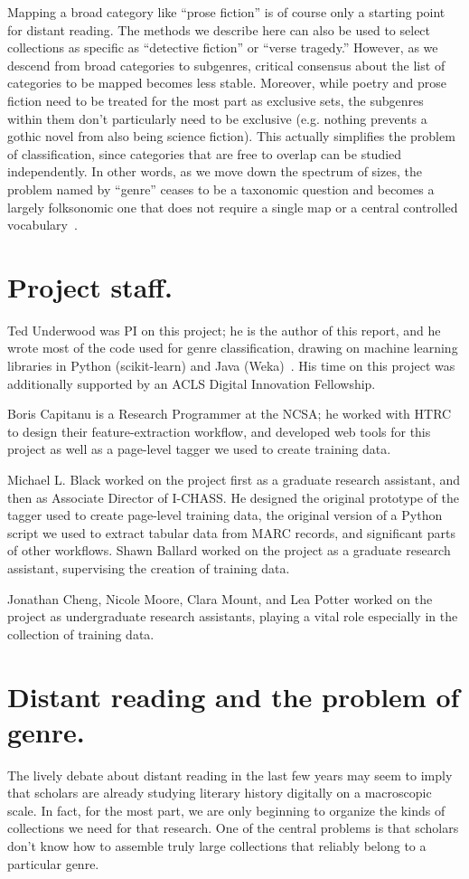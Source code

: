 \documentclass[paper=a4, fontsize=12pt]{scrartcl}
\numberwithin{equation}{section}		%
\numberwithin{figure}{section}			%
\numberwithin{table}{section}				%
\begin{document}
Mapping a broad category like ``prose fiction'' is of course only a starting point for distant reading. The methods we describe here can also be used to select collections as specific as ``detective fiction'' or ``verse tragedy.'' However, as we descend from broad categories to subgenres, critical consensus about the list of categories to be mapped becomes less stable. Moreover, while poetry and prose fiction need to be treated for the most part as exclusive sets, the subgenres within them don't particularly need to be exclusive (e.g. nothing prevents a gothic novel from also being science fiction). This actually simplifies the problem of classification, since categories that are free to overlap can be studied independently. In other words, as we move down the spectrum of sizes, the problem named by ``genre'' ceases to be a taxonomic question and becomes a largely folksonomic one that does not require a single map or a central controlled vocabulary~\cite{vanderwal:folksonomy}.

\section{Project staff.}
Ted Underwood was PI on this project; he is the author of this report, and he wrote most of the code used for genre classification, drawing on machine learning libraries in Python (scikit-learn) and Java (Weka)~\cite{scikit-learn, weka}. His time on this project was additionally supported by an ACLS Digital Innovation Fellowship.

Boris Capitanu is a Research Programmer at the NCSA; he worked with HTRC to design their feature-extraction workflow, and developed web tools for this project as well as a page-level tagger we used to create training data.

Michael L. Black worked on the project first as a graduate research assistant, and then as Associate Director of I-CHASS. He designed the original prototype of the tagger used to create page-level training data, the original version of a Python script we used to extract tabular data from MARC records, and significant parts of other workflows. Shawn Ballard worked on the project as a graduate research assistant, supervising the creation of training data.

Jonathan Cheng, Nicole Moore, Clara Mount, and Lea Potter worked on the project as undergraduate research assistants, playing a vital role especially in the collection of training data.

\newpage
\section{Distant reading and the problem of genre.}
The lively debate about distant reading in the last few years may seem to imply that scholars are already studying literary history digitally on a macroscopic scale. In fact, for the most part, we are only beginning to organize the kinds of collections we need for that research. One of the central problems is that scholars don't know how to assemble truly large collections that reliably belong to a particular genre.
\end{document}
